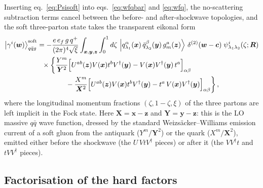 \documentclass[11pt,a4paper]{article}
\newcommand{\ket}[1]{\left|#1\right\rangle}
\newcommand{\vx}{\bm{x}}
\newcommand{\vy}{\bm{y}}
\newcommand{\vz}{\bm{z}}
\newcommand{\vw}{\bm{w}}
\newcommand{\vc}{\bm{c}}
\newcommand{\vR}{\bm{R}}
\newcommand{\vY}{\bm{Y}}
\newcommand{\vX}{\bm{X}}
\numberwithin{equation}{section}
\begin{document}
Inserting eq.~\eqref{eq:Psisoft} into eqs.~\eqref{eq:wfqbar} and \eqref{eq:wfq}, the
no-scattering subtraction terms cancel between the before- and after-shockwave topologies,
and the soft three-parton state takes the transparent eikonal form
\begin{align}
\label{eq:wfsoft}
\ket{\gamma^{i}(\vw)}^{\rm soft}_{q\bar{q}g} &=
-\frac{e\,e_{f}\,g\,q^{+}}{(2\pi)^{4}\sqrt{\xi}}
\int_{\vx,\vy,\vz} \int_{0}^{1} d\zeta\,
\ket{q^{\alpha}_{\lambda_{1}}(\vx)\,\bar{q}^{\beta}_{\lambda_{2}}(\vy)\,g^{a}_{m}(\vz)}\,
\delta^{(2)}(\vw-\vc)\;\psi^{i}_{\lambda_{1}\lambda_{2}}(\zeta;\vR) \notag\\
&\ \ \times\bigg\{\frac{Y^{m}}{\vY^{2}}
\Big[U^{ab}(\vz)V(\vx)t^{b}V^{\dagger}(\vy)-V(\vx)V^{\dagger}(\vy)\,t^{a}\Big]_{\alpha\beta}
\notag\\
&\hspace{1.45cm}-\frac{X^{m}}{\vX^{2}}
\Big[U^{ab}(\vz)V(\vx)t^{b}V^{\dagger}(\vy)-t^{a}\,V(\vx)V^{\dagger}(\vy)\Big]_{\alpha\beta}
\bigg\}\,,
\end{align}
where the longitudinal momentum fractions $(\zeta,1-\zeta,\xi)$ of the three partons are
left implicit in the Fock state. Here $\vX=\vx-\vz$ and $\vY=\vy-\vz$: this is the LO massive $q\bar q$ wave function, dressed by the
standard Weizs\"acker--Williams emission current of a soft gluon from the antiquark
($Y^{m}/\vY^{2}$) or the quark ($X^{m}/\vX^{2}$), emitted either before the shockwave (the
$U\,VtV^\dagger$ pieces) or after it (the $VV^{\dagger}t$ and $tVV^{\dagger}$ pieces).

\subsection{Factorisation of the hard factors}
\label{sec:softhard}
\end{document}
